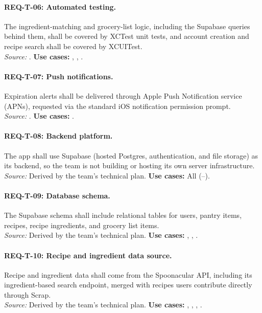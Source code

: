 \paragraph{REQ-T-06: Automated testing.}
 The ingredient-matching and grocery-list logic, including the Supabase queries behind them, shall be covered by XCTest unit tests, and account creation and recipe search shall be covered by XCUITest.\\
\textit{Source:} . \textbf{Use cases:} , , .

\paragraph{REQ-T-07: Push notifications.}
 Expiration alerts shall be delivered through Apple Push Notification service (APNs), requested via the standard iOS notification permission prompt.\\
\textit{Source:} . \textbf{Use cases:} .

\paragraph{REQ-T-08: Backend platform.}
 The app shall use Supabase (hosted Postgres, authentication, and file storage) as its backend, so the team is not building or hosting its own server infrastructure.\\
\textit{Source:} Derived by the team's technical plan. \textbf{Use cases:} All (--).

\paragraph{REQ-T-09: Database schema.}
 The Supabase schema shall include relational tables for users, pantry items, recipes, recipe ingredients, and grocery list items.\\
\textit{Source:} Derived by the team's technical plan. \textbf{Use cases:} , , .

\paragraph{REQ-T-10: Recipe and ingredient data source.}
 Recipe and ingredient data shall come from the Spoonacular API, including its ingredient-based search endpoint, merged with recipes users contribute directly through Scrap.\\
\textit{Source:} Derived by the team's technical plan. \textbf{Use cases:} , , , .


